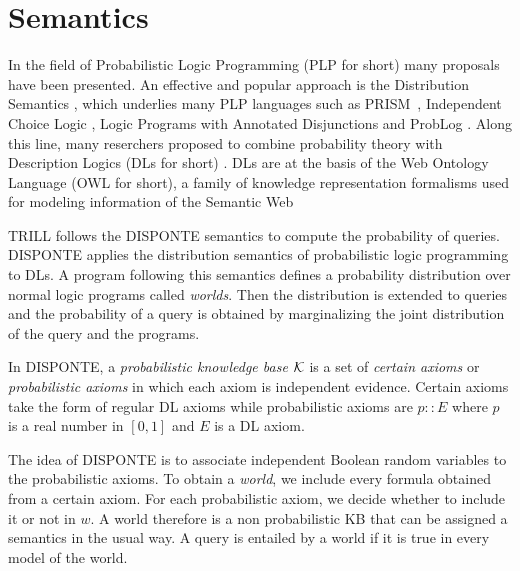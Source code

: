 \section{Semantics}
\label{semantics}

In the field of Probabilistic Logic Programming (PLP for short) many proposals have been presented. 
An effective and popular approach is the Distribution Semantics \cite{DBLP:conf/iclp/Sato95}, which underlies many PLP languages such as
 PRISM~\cite{DBLP:conf/iclp/Sato95,DBLP:journals/jair/SatoK01},
 Independent Choice Logic  \cite{Poo97-ArtInt-IJ}, Logic Programs with Annotated Disjunctions \cite{VenVer04-ICLP04-IC} and ProbLog \cite{DBLP:conf/ijcai/RaedtKT07}.
 Along this line, many reserchers proposed to combine probability theory with Description Logics (DLs for short) \cite{DBLP:journals/ws/LukasiewiczS08,DBLP:conf/rweb/Straccia08}.
DLs are at the basis of the Web Ontology Language (OWL for short), a family of knowledge representation formalisms used for modeling information
 of the Semantic Web

TRILL follows the DISPONTE \cite{RigBelLamZese12-URSW12,Zese17-SSW-BK} semantics to compute the probability of queries.
DISPONTE applies the distribution semantics \cite{DBLP:conf/iclp/Sato95} of probabilistic logic programming to DLs. 
A program following this semantics defines a probability distribution over normal logic programs
called \emph{worlds}. Then the distribution is extended to queries and the probability of a query is obtained by marginalizing the joint distribution of the query and the programs.

In DISPONTE, a \emph{probabilistic knowledge base} ${\cal K}$ is a set of \emph{certain axioms} or \emph{probabilistic axioms} in which each axiom is independent evidence.
Certain axioms take the form of regular DL axioms while probabilistic axioms are
$p::E$
where $p$ is a real number in $[0,1]$ and $E$ is a DL axiom. 

The idea of DISPONTE is to associate independent Boolean random variables to the probabilistic axioms. 
To obtain a \emph{world}, we include every formula obtained from a certain axiom. 
For each probabilistic axiom, we decide whether to include it or not in $w$.
A world therefore is a non probabilistic KB that can be assigned a semantics in the usual way.
A query is entailed by a world if it is true in every  model of the world.

